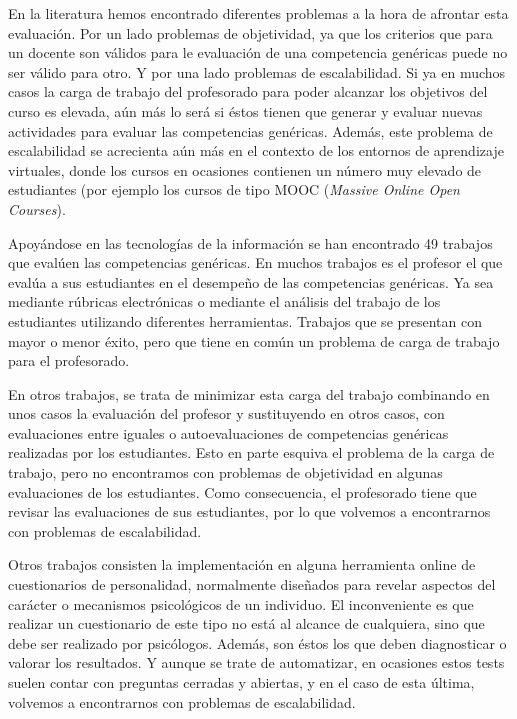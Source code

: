 En la literatura hemos encontrado diferentes problemas a la hora de afrontar esta evaluación. Por un lado problemas de objetividad, ya que los criterios que para un docente son válidos para le evaluación de una competencia genéricas puede no ser válido para otro. Y por una lado problemas de escalabilidad. Si ya en muchos casos la carga de trabajo del profesorado para poder alcanzar los objetivos del curso es elevada, aún más lo será si éstos tienen que generar y evaluar nuevas actividades para evaluar las competencias genéricas. Además, este problema de escalabilidad se acrecienta aún más en el contexto de los entornos de aprendizaje virtuales, donde los cursos en ocasiones contienen un número muy elevado de estudiantes (por ejemplo los cursos de tipo MOOC (\emph{Massive Online Open Courses}).

Apoyándose en las tecnologías de la información se han encontrado 49 trabajos que evalúen las competencias genéricas. En muchos trabajos es el profesor el que evalúa a sus estudiantes en el desempeño de las competencias genéricas. Ya sea mediante rúbricas electrónicas o mediante el análisis del trabajo de los estudiantes utilizando diferentes herramientas. Trabajos que se presentan con mayor o menor éxito, pero que tiene en común un problema de carga de trabajo para el profesorado.

En otros trabajos, se trata de minimizar esta carga del trabajo combinando en unos casos la evaluación del profesor y sustituyendo en otros casos, con evaluaciones entre iguales o autoevaluaciones de competencias genéricas realizadas por los estudiantes. Esto en parte esquiva el problema de la carga de trabajo, pero no encontramos con problemas de objetividad en algunas evaluaciones de los estudiantes. Como consecuencia, el profesorado tiene que revisar las evaluaciones de sus estudiantes, por lo que volvemos a encontrarnos con problemas de escalabilidad.

Otros trabajos consisten la implementación en alguna herramienta online de cuestionarios de personalidad, normalmente diseñados para revelar aspectos del carácter o mecanismos psicológicos de un individuo. El inconveniente es que realizar un cuestionario de este tipo no está al alcance de cualquiera, sino que debe ser realizado por psicólogos. Además, son éstos los que deben diagnosticar o valorar los resultados. Y aunque se trate de automatizar, en ocasiones estos tests suelen contar con preguntas cerradas y abiertas, y en el caso de esta última, volvemos a encontrarnos con problemas de escalabilidad.

